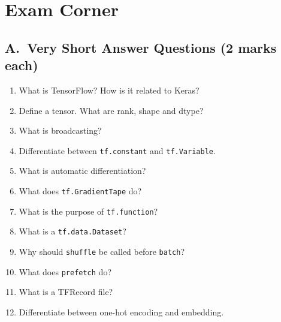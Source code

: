 \section*{Exam Corner}

\subsection*{A.\ Very Short Answer Questions (2 marks each)}
\begin{enumerate}
  \item What is TensorFlow? How is it related to Keras? 
  \item Define a tensor. What are rank, shape and dtype? 
  \item What is broadcasting? 
  \item Differentiate between \texttt{tf.constant} and \texttt{tf.Variable}. 
  \item What is automatic differentiation? 
  \item What does \texttt{tf.GradientTape} do? 
  \item What is the purpose of \texttt{tf.function}? 
  \item What is a \texttt{tf.data.Dataset}? 
  \item Why should \texttt{shuffle} be called before \texttt{batch}? 
  \item What does \texttt{prefetch} do? 
  \item What is a TFRecord file? 
  \item Differentiate between one-hot encoding and embedding. 
\end{enumerate}

